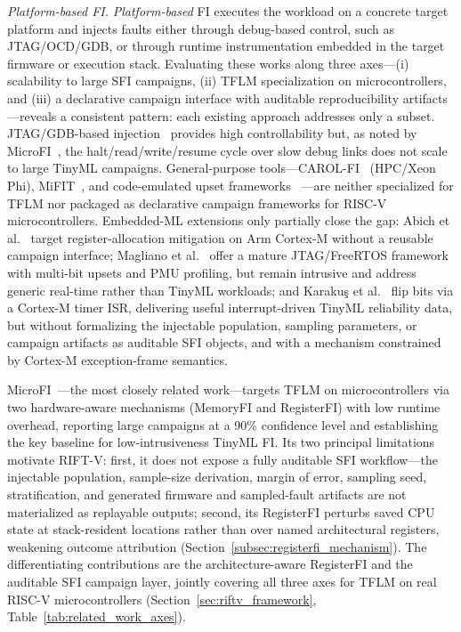 \documentclass[conference]{IEEEtran}
\begin{document}
\emph{Platform-based FI.}
\emph{Platform-based} FI executes the workload on a concrete target platform and injects faults either through debug-based control, such as JTAG/OCD/GDB, or through runtime instrumentation embedded in the target firmware or execution stack. Evaluating these works along three axes---(i) scalability to large SFI campaigns, (ii) TFLM specialization on microcontrollers, and (iii) a declarative campaign interface with auditable reproducibility artifacts---reveals a consistent pattern: each existing approach addresses only a subset. JTAG/GDB-based injection~\cite{article} provides high controllability but, as noted by MicroFI~\cite{de2025MicroFI}, the halt/read/write/resume cycle over slow debug links does not scale to large TinyML campaigns. General-purpose tools---CAROL-FI~\cite{Oliveira2017CAROL} (HPC/Xeon Phi), MiFIT~\cite{Aponte2019MiFIT}, and code-emulated upset frameworks~\cite{Williams2025Evaluating} ---are neither specialized for TFLM nor packaged as declarative campaign frameworks for RISC-V microcontrollers. Embedded-ML extensions only partially close the gap: Abich et al.~\cite{Abich2021Applying} target register-allocation mitigation on Arm Cortex-M without a reusable campaign interface; Magliano et al.~\cite{Magliano2025Real} offer a mature JTAG/FreeRTOS framework with multi-bit upsets and PMU profiling, but remain intrusive and address generic real-time rather than TinyML workloads; and Karakuş et al.~\cite{Karakus2024Soft} flip bits via a Cortex-M timer ISR, delivering useful interrupt-driven TinyML reliability data, but without formalizing the injectable population, sampling parameters, or campaign artifacts as auditable SFI objects, and with a mechanism constrained by Cortex-M exception-frame semantics.

MicroFI~\cite{de2025MicroFI}---the most closely related work---targets TFLM on microcontrollers via two hardware-aware mechanisms (MemoryFI and RegisterFI) with low runtime overhead, reporting large campaigns at a 90\% confidence level and establishing the key baseline for low-intrusiveness TinyML FI. Its two principal limitations motivate RIFT-V: first, it does not expose a fully auditable SFI workflow---the injectable population, sample-size derivation, margin of error, sampling seed, stratification, and generated firmware and sampled-fault artifacts are not materialized as replayable outputs; second, its RegisterFI perturbs saved CPU state at stack-resident locations rather than over named architectural registers, weakening outcome attribution (Section~\ref{subsec:registerfi_mechanism}). The differentiating contributions are the architecture-aware RegisterFI and the auditable SFI campaign layer, jointly covering all three axes for TFLM on real RISC-V microcontrollers (Section~\ref{sec:riftv_framework}, Table~\ref{tab:related_work_axes}).
\end{document}
